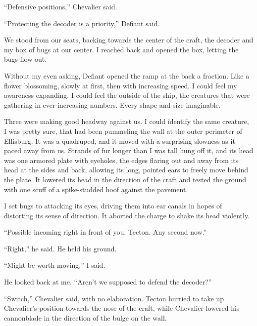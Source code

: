 ``Defensive positions,'' Chevalier said.



``Protecting the decoder is a priority,'' Defiant said.



We stood from our seats, backing towards the center of the craft, the decoder and my box of bugs at our center.  I reached back and opened the box, letting the bugs flow out.



Without my even asking, Defiant opened the ramp at the back a fraction.  Like a flower blossoming, slowly at first, then with increasing speed, I could feel my awareness expanding.  I could feel the outside of the ship, the creatures that were gathering in ever-increasing numbers.  Every shape and size imaginable.



Three were making good headway against us.  I could identify the same creature, I was pretty sure, that had been pummeling the wall at the outer perimeter of Ellisburg.  It was a quadruped, and it moved with a surprising slowness as it paced away from us.  Strands of fur longer than I was tall hung off it, and its head was one armored plate with eyeholes, the edges flaring out and away from its head at the sides and back, allowing its long, pointed ears to freely move behind the plate.  It lowered its head in the direction of the craft and tested the ground with one scuff of a spike-studded hoof against the pavement.



I set bugs to attacking its eyes, driving them into ear canals in hopes of distorting its sense of direction.  It aborted the charge to shake its head violently.



``Possible incoming right in front of you, Tecton.  Any second now.''



``Right,'' he said.  He held his ground.



``Might be worth moving,'' I said.



He looked back at me.  ``Aren't we supposed to defend the decoder?''



``Switch,'' Chevalier said, with no elaboration.  Tecton hurried to take up Chevalier's position towards the nose of the craft, while Chevalier lowered his cannonblade in the direction of the bulge on the wall.



